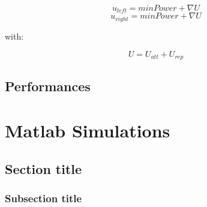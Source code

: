 \documentclass[a4paper,11pt,oneside]{book}
\begin{document}
			$$u_{left} = minPower + \nabla U$$
		    $$u_{right}= minPower + \nabla U$$
		    
		with:
		
			$$U = U_{att} + U_{rep} $$
		
		\section{Performances}
		
		
		
		
		
		
		\chapter{Matlab Simulations}
		
		\section{Section title}
		\subsection {Subsection title}
		
		
		
		
		
		
		
		{}
		
		
		
\end{document}
